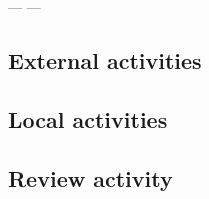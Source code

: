 ---
---

\subsection*{External activities}



\subsection*{Local activities}



\subsection*{Review activity}


